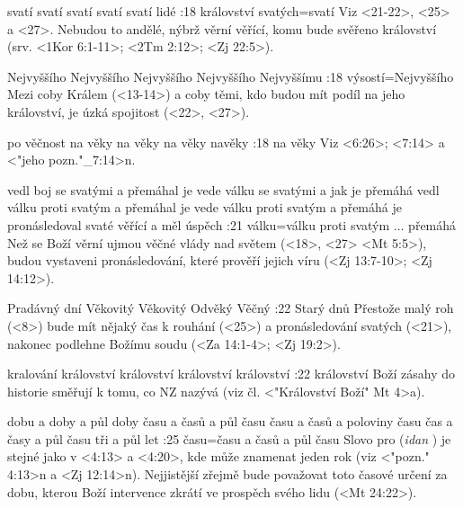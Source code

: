    {svatí}   %
   {svatí}   %
   {svatí}   %
   {svatí}   %
   {svatí lidé}   %
:18 {království svatých}={svatí}  Viz <21-22>, <25> a <27>. Nebudou to andělé, nýbrž věrní věřící, komu bude svěřeno království (srv. <1Kor 6:1-11>; <2Tm 2:12>; <Zj 22:5>). 

   {Nejvyššího}   %
   {Nejvyššího}   %
   {Nejvyššího}   %
   {Nejvyššího}   %
   {Nejvyššímu}   %
:18 {výsostí}={Nejvyššího} Mezi  coby Králem (<13-14>) a  coby těmi, kdo budou mít podíl na jeho království, je úzká spojitost (<22>, <27>).

   {po věčnost}   %
   {na věky}   %
   {na věky}   %
   {na věky}   %
   {navěky}   %
:18 {na věky}  Viz <6:26>;  <7:14> a <"jeho pozn."_7:14>n.

   {vedl boj se svatými a přemáhal je}   %
   {vede válku se svatými a jak je přemáhá}   %
   {vedl válku proti svatým a přemáhal je}   %
   {vede válku proti svatým a přemáhá je}   %
   {pronásledoval svaté věřící a měl úspěch}   %
:21 {válku}={válku proti svatým ... přemáhá} Než se Boží věrní ujmou věčné vlády nad světem  (<18>, <27> <Mt 5:5>), budou vystaveni pronásledování, které prověří jejich víru  (<Zj 13:7-10>; <Zj 14:12>).

   {Pradávný dní}   %
   {Věkovitý}   %
   {Věkovitý}   %
   {Odvěký}   %
   {Věčný}   %
:22 {Starý dnů} Přestože malý roh  (<8>) bude mít nějaký čas k rouhání (<25>) a pronásledování svatých (<21>), nakonec podlehne Božímu soudu (<Za 14:1-4>; <Zj 19:2>).

   {kralování}   %
   {království}   %
   {království}   %
   {království}   %
   {království}   %
:22 {království} Boží zásahy do historie směřují k tomu, co NZ nazývá   (viz čl. <"Království Boží" Mt 4>a).

   {dobu a doby a půl doby}   %
   {času a časů a půl času}   %
   {času a časů a poloviny času}   %
   {čas a časy a půl času}   %
   {tři a půl let}   %
:25 {času}={času a časů a půl času} Slovo pro  ({\it idan\/} \Idan) je stejné jako v <4:13> a <4:20>, kde může znamenat jeden rok (viz <"pozn." 4:13>n a <Zj 12:14>n). Nejjistější zřejmě bude považovat toto časové určení za dobu, kterou  Boží intervence zkrátí ve prospěch svého lidu (<Mt 24:22>).

